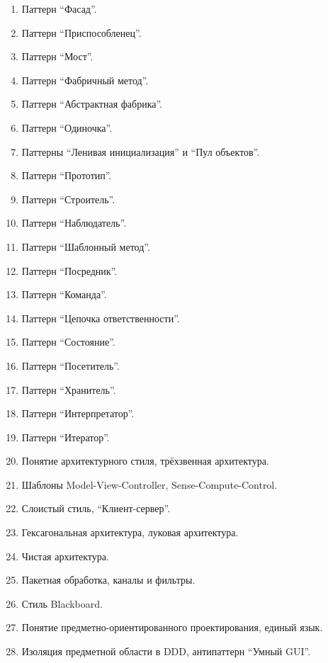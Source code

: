\documentclass[a5paper]{article}
\begin{document}
\begin{enumerate}
    \item Паттерн \enquote{Фасад}.
    \item Паттерн \enquote{Приспособленец}.
    \item Паттерн \enquote{Мост}.
    \item Паттерн \enquote{Фабричный метод}.
    \item Паттерн \enquote{Абстрактная фабрика}.
    \item Паттерн \enquote{Одиночка}.
    \item Паттерны \enquote{Ленивая инициализация} и \enquote{Пул объектов}.
    \item Паттерн \enquote{Прототип}.
    \item Паттерн \enquote{Строитель}.
    \item Паттерн \enquote{Наблюдатель}.
    \item Паттерн \enquote{Шаблонный метод}.
    \item Паттерн \enquote{Посредник}.
    \item Паттерн \enquote{Команда}.
    \item Паттерн \enquote{Цепочка ответственности}.
    \item Паттерн \enquote{Состояние}.
    \item Паттерн \enquote{Посетитель}.
    \item Паттерн \enquote{Хранитель}.
    \item Паттерн \enquote{Интерпретатор}.
    \item Паттерн \enquote{Итератор}.
    \item Понятие архитектурного стиля, трёхзвенная архитектура.
    \item Шаблоны Model-View-Controller, Sense-Compute-Control.
    \item Слоистый стиль, \enquote{Клиент-сервер}.
    \item Гексагональная архитектура, луковая архитектура.
    \item Чистая архитектура.
    \item Пакетная обработка, каналы и фильтры. 
    \item Стиль Blackboard.
    \item Понятие предметно-ориентированного проектирования, единый язык.
    \item Изоляция предметной области в DDD, антипаттерн \enquote{Умный GUI}.

\end{enumerate}
\end{document}
